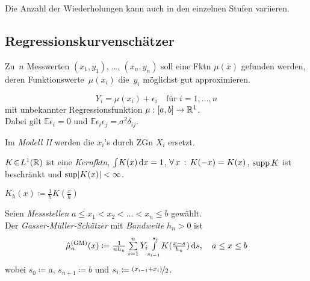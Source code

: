 \documentclass{cheat-sheet}
\newcommand{\E}{\mathbb{E}} %
\begin{document}
\begin{bem}
  Die Anzahl der Wiederholungen kann auch in den einzelnen Stufen variieren.
\end{bem}


\subsection{Regressionskurvenschätzer}

\begin{problem}
  Zu~$n$ Messwerten $(x_1, y_1)$, \ldots, $(x_n, y_n)$ soll eine Fktn $\mu(x)$ gefunden werden, deren Funktionswerte~$\mu(x_i)$ die~$y_i$ möglichst gut approximieren.
\end{problem}

\begin{modell}
  \[
    Y_i = \mu(x_i) + \epsilon_i \quad
    \text{für } i = 1, \ldots, n
  \]
  mit unbekannter Regressionsfunktion $\mu : \left[ a, b \right] \to \mathbb{R}^1$. \\
  Dabei gilt
  $\E \epsilon_i = 0$ und
  $\E \epsilon_i \epsilon_j = \sigma^2 \delta_{ij}$.
\end{modell}

\begin{bem}
  Im \emph{Modell II} werden die $x_i$'s durch ZGn $X_i$ ersetzt.
\end{bem}

\begin{voraussetzung}
  $K \!\in\! L^1(\mathbb{R})$ ist eine \emph{Kernfktn}, \dh{} ${\textstyle \int} K(x) \,\mathrm{d} x = 1$, $\forall \, {x} \,:\, K(-x) = K(x)$, $\operatorname{supp} K$ ist beschränkt und $\sup \lvert K(x)\rvert < \infty$.
\end{voraussetzung}

\begin{nota}
  $K_h(x) \coloneqq \tfrac{1}{h} K(\tfrac{x}{h})$
\end{nota}

\begin{defn}
  Seien \textit{Messstellen} $a \leq x_1 < x_2 < \ldots < x_n \leq b$ gewählt. \\
  Der \emph{Gasser-Müller-Schätzer} mit \textit{Bandweite} $h_n > 0$ ist
  \[
    \hat{\mu}^{\text{(GM)}}_n(x) \coloneqq \tfrac{1}{n h_n} \sum_{i=1}^n Y_i \Int{s_{i-1}}{s_i}{K(\tfrac{x-s}{h_n})}{s}, \quad
    a \leq x \leq b
  \]
  wobei $s_0 \coloneqq a$, $s_{n+1} \coloneqq b$ und $s_i \coloneqq \nicefrac{(x_{i-1} + x_i)}{2}$.
\end{defn}
\end{document}
